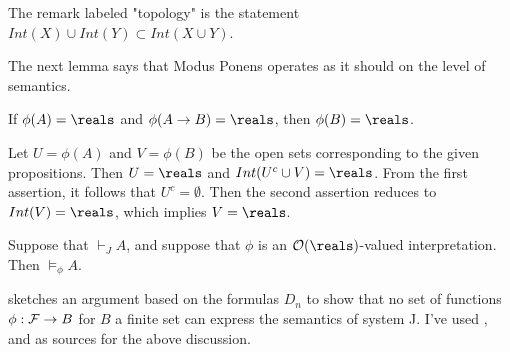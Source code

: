 The remark labeled "topology" is the statement $Int(X) \cup Int(Y) \subset Int(X \cup Y)$.

The next lemma says that Modus Ponens operates as it should
on the level of semantics.

\begin{lemma}
If $\phi(A) = \reals$ and $\phi(A \to B) = \reals$, then $\phi(B) = \reals$.
\end{lemma}

 Let $U = \phi(A)$ and $V = \phi(B)$ be the open sets corresponding to the given propositions.  Then $U = \reals$ and $Int( U^c \cup V) = \reals$.  From the first assertion, it follows that $U^c = \emptyset$.  Then the second assertion reduces to $Int(V) = \reals$, which implies $V = \reals$. 

\begin{theorem}
Suppose that $\vdash_J A$, and suppose that $\phi$ is an $\opensets(\reals)$-valued interpretation.  Then $\models_\phi A$.
\end{theorem}


\cite{RH} sketches an argument based on the formulas $D_n$ to show that no set of functions $\phi: \mathcal{F} \to B$ for $B$ a finite set can express the semantics of system J. I've used \cite{RH}, \cite{WKIL} and \cite{EPS} as sources for the above discussion.
